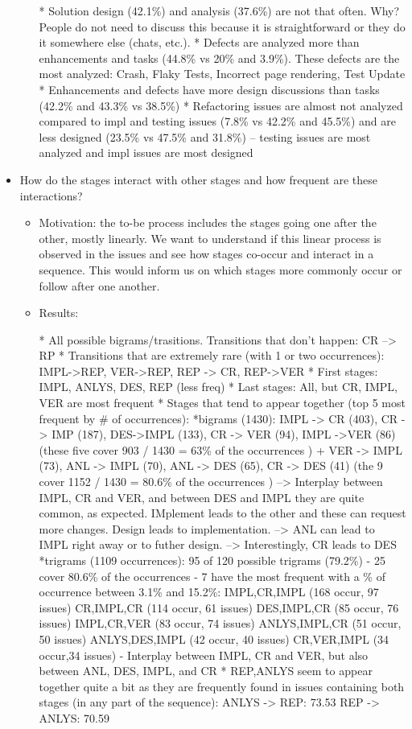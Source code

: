 \begin{itemize}
\begin{itemize}
		* Solution design (42.1\%) and analysis (37.6\%) are not that often. Why? People do not need to discuss this because it is straightforward or they do it somewhere else (chats, etc.).
		* Defects are analyzed more than enhancements and tasks (44.8\% vs 20\% and 3.9\%). These defects are the most analyzed: Crash, Flaky Tests,  Incorrect page rendering, Test Update
		* Enhancements and defects have more design discussions than tasks (42.2\% and 43.3\% vs 38.5\%)
		* Refactoring issues are almost not analyzed compared to impl and testing issues (7.8\% vs 42.2\% and 45.5\%)  and are less designed (23.5\% vs 47.5\% and 31.8\%) -- testing issues are most analyzed and impl issues are most designed
	\end{itemize}
	
	\item How do the stages interact with other stages and how frequent are these interactions?
	\begin{itemize}
		\item Motivation: the to-be process includes the stages going one after the other, mostly linearly. We want to understand if this linear process is observed in the issues and see how stages co-occur and interact in a sequence. This would inform us on which stages more commonly occur or follow after one another.
		\item Results: 
		
		* All possible bigrams/trasitions. Transitions that don't happen: CR --> RP
		* Transitions that are extremely rare (with 1 or two occurrences): IMPL->REP, VER->REP, REP -> CR, REP->VER
		* First stages: IMPL, ANLYS, DES, REP (less freq)
		* Last stages: All, but CR, IMPL, VER are most frequent
		* Stages that tend to appear together (top 5 most frequent by \# of occurrences):
				*bigrams (1430): 
							IMPL -> CR (403), CR -> IMP (187), DES->IMPL (133), CR -> VER (94), IMPL ->VER (86)  (these five cover 903 / 1430 = 63\% of the occurrences )
							      +  VER -> IMPL (73), ANL -> IMPL (70), ANL -> DES (65), CR -> DES (41)  (the 9 cover 1152 / 1430 = 80.6\% of the occurrences )
							        --> Interplay between IMPL, CR and VER, and between DES and IMPL they are quite common, as expected. IMplement leads to the other and these can request more changes. Design leads to implementation.
							        --> ANL can lead to IMPL right away or to futher design.
							        --> Interestingly, CR leads to DES
				*trigrams (1109 occurrences):  95 of 120 possible trigrams (79.2\%)
					- 25 cover 80.6\% of the occurrences
					- 7 have the most frequent with a \% of occurrence between 3.1\% and 15.2\%: 
					IMPL,CR,IMPL (168 occur, 97 issues)
					CR,IMPL,CR (114 occur, 61 issues)
					DES,IMPL,CR (85 occur, 76 issues)
					IMPL,CR,VER (83 occur, 74 issues)
					ANLYS,IMPL,CR (51 occur, 50 issues)
					ANLYS,DES,IMPL (42 occur, 40 issues)
					CR,VER,IMPL  (34 occur,34 issues)
					- Interplay between IMPL, CR and VER, but also between ANL, DES, IMPL, and CR
		* REP,ANLYS	seem to appear together quite a bit as they are frequently found in issues containing both stages (in any part of the sequence):
				ANLYS -> REP: 73.53
				REP  -> ANLYS: 70.59
	

\end{itemize}
\end{itemize}
